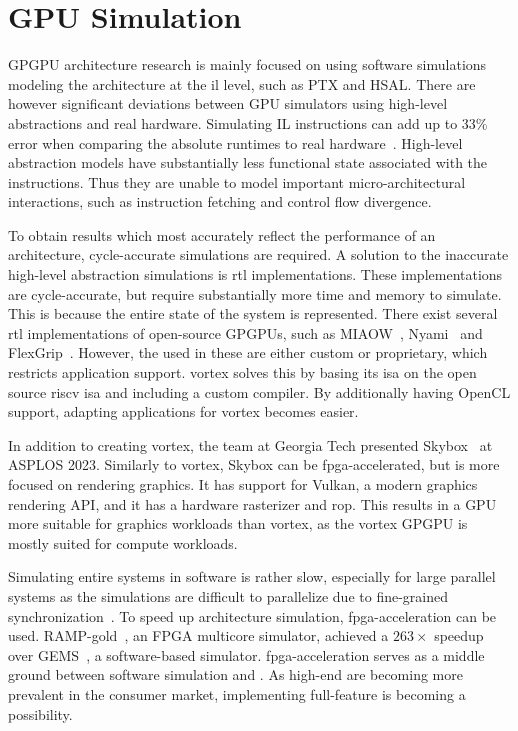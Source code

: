 \section{GPU Simulation} \label{sec:gpu_simulation}

GPGPU architecture research is mainly focused on using software simulations~\cite{gem5_gpu, gpu_sim_cuda, multi2sim} modeling the architecture at the \acrfull{il} level, such as PTX and HSAL. There are however significant deviations between GPU simulators using high-level abstractions and real hardware. Simulating IL instructions can add up to 33\% error when comparing the absolute runtimes to real hardware~\cite{lost_in_abstraction}. High-level abstraction models have substantially less functional state associated with the instructions. Thus they are unable to model important micro-architectural interactions, such as instruction fetching and control flow divergence.

To obtain results which most accurately reflect the performance of an architecture, cycle-accurate simulations are required. A solution to the inaccurate high-level abstraction simulations is \acrfull{rtl} implementations. These implementations are cycle-accurate, but require substantially more time and memory to simulate. This is because the entire state of the system is represented. There exist several \acrshort{rtl} implementations of open-source GPGPUs, such as MIAOW~\cite{MIAOW}, Nyami~\cite{Nyami} and FlexGrip~\cite{FlexGrip}. However, the  used in these  are either custom or proprietary, which restricts application support. \Gls{vortex} solves this by basing its \acrshort{isa} on the open source \Gls{riscv} \acrshort{isa} and including a custom compiler. By additionally having OpenCL support, adapting applications for \Gls{vortex} becomes easier.

In addition to creating \Gls{vortex}, the team at Georgia Tech presented Skybox~\cite{skybox} at ASPLOS 2023. Similarly to \Gls{vortex}, Skybox can be \acrshort{fpga}-accelerated, but is more focused on rendering graphics. It has support for Vulkan, a modern graphics rendering API, and it has a hardware rasterizer and \acrfull{rop}. This results in a GPU more suitable for graphics workloads than \Gls{vortex}, as the \Gls{vortex} GPGPU is mostly suited for compute workloads.

Simulating entire systems in software is rather slow, especially for large parallel systems as the simulations are difficult to parallelize due to fine-grained synchronization~\cite{graphite, wwt2}. To speed up architecture simulation, \acrshort{fpga}-acceleration can be used. RAMP-gold~\cite{RAMP-gold}, an FPGA multicore simulator, achieved a $263\times$ speedup over GEMS~\cite{gems}, a software-based simulator. \acrshort{fpga}-acceleration serves as a middle ground between software simulation and . As high-end  are becoming more prevalent in the consumer market, implementing full-feature  is becoming a possibility.

